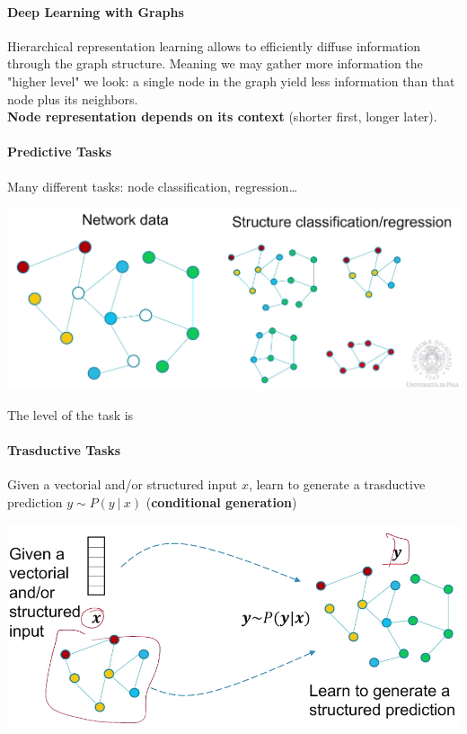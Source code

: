 \documentclass[10pt]{report}
\begin{document}
\paragraph{Deep Learning with Graphs} Hierarchical representation learning allows to efficiently diffuse information through the graph structure. Meaning we may gather more information the "higher level" we look: a single node in the graph yield less information than that node plus its neighbors.\\\textbf{Node representation depends on its context} (shorter first, longer later).
\paragraph{Predictive Tasks} Many different tasks: node classification, regression\ldots
\begin{center}
	\includegraphics[scale=0.5]{192.png}
\end{center}
The level of the task is %
\paragraph{Trasductive Tasks} Given a vectorial and/or structured input $x$, learn to generate a trasductive prediction $y\sim P(y\:|\:x)$ (\textbf{conditional generation})
\begin{center}
	\includegraphics[scale=0.5]{193.png}
\end{center}
\end{document}
